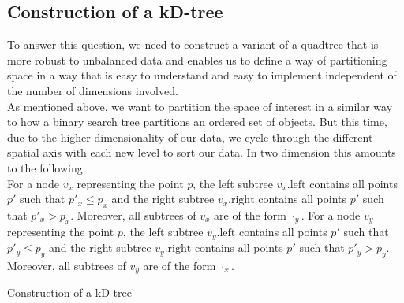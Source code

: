     \subsection{Construction of a kD-tree}
        To answer this question, we need to construct a variant of a quadtree that is more robust to unbalanced data and enables us to define a way of partitioning space in a way that is easy to understand and easy to implement independent of the number of dimensions involved. \\
        As mentioned above, we want to partition the space of interest in a similar way to how a binary search tree partitions an ordered set of objects. But this time, due to the higher dimensionality of our data, we cycle through the different spatial axis with each new level to sort our data. In two dimension this amounts to the following: \\
        For a node $v_x$ representing the point $p$, the left subtree $v_x.\text{left}$ contains all points $p'$ such that $p'_x \leq p_x$ and the right subtree $v_x.\text{right}$ contains all points $p'$ such that $p'_x > p_x$. Moreover, all subtrees of $v_x$ are of the form $\cdot_y$. For a node $v_y$ representing the point $p$, the left subtree $v_y.\text{left}$ contains all points $p'$ such that $p'_y \leq p_y$ and the right subtree $v_y.\text{right}$ contains all points $p'$ such that $p'_y > p_y$. Moreover, all subtrees of $v_y$ are of the form $\cdot_x$. 

        \begin{breakablealgorithm}
            \caption{Construction of a kD-tree}
            \label{alg:kdtree_construction}
            \begin{algorithmic}[1]
                     
                \EndProcedure
                    \EndIf
                     
                     
                     
                     
                \EndProcedure
            \end{algorithmic}
        \end{breakablealgorithm}


